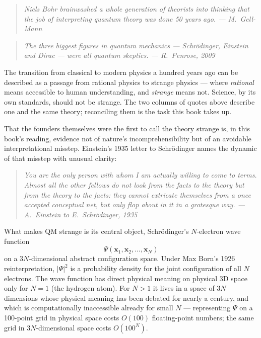 \begin{quote}
\itshape Niels Bohr brainwashed a whole generation of theorists into thinking that the job of interpreting quantum theory was done 50 years ago. \normalfont\hfill --- M.~Gell-Mann
\end{quote}

\begin{quote}
\itshape The three biggest figures in quantum mechanics --- Schr\"odinger, Einstein and Dirac --- were all quantum skeptics. \normalfont\hfill --- R.~Penrose, 2009
\end{quote}

The transition from classical to modern physics a hundred years ago can be described as a passage from rational physics to strange physics --- where \emph{rational} means accessible to human understanding, and \emph{strange} means not. Science, by its own standards, should not be strange. The two columns of quotes above describe one and the same theory; reconciling them is the task this book takes up.

That the founders themselves were the first to call the theory strange is, in this book's reading, evidence not of nature's incomprehensibility but of an avoidable interpretational misstep. Einstein's 1935 letter to Schr\"odinger names the dynamic of that misstep with unusual clarity:

\begin{quote}
\itshape You are the only person with whom I am actually willing to come to terms. Almost all the other fellows do not look from the facts to the theory but from the theory to the facts: they cannot extricate themselves from a once accepted conceptual net, but only flop about in it in a grotesque way. \normalfont\hfill --- A.~Einstein to E.~Schr\"odinger, 1935
\end{quote}

What makes QM strange is its central object, Schr\"odinger's $N$-electron wave function
\[
\Psi(\mathbf{x}_1, \mathbf{x}_2, \ldots, \mathbf{x}_N)
\]
on a $3N$-dimensional abstract configuration space. Under Max Born's 1926 reinterpretation, $|\Psi|^2$ is a probability density for the joint configuration of all $N$ electrons. The wave function has direct physical meaning on physical 3D space only for $N=1$ (the hydrogen atom). For $N > 1$ it lives in a space of $3N$ dimensions whose physical meaning has been debated for nearly a century, and which is computationally inaccessible already for small $N$ --- representing $\Psi$ on a 100-point grid in physical space costs $O(100)$ floating-point numbers; the same grid in $3N$-dimensional space costs $O(100^N)$.

